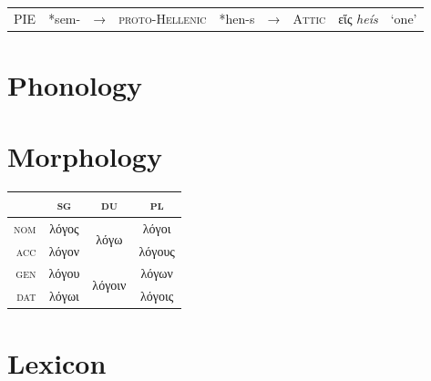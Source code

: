 \documentclass[svgnames,x11names,b5paper]{book}
\begin{document}
\begin{table}[H]
    \begin{center}
    \begin{tabular}{lllllllll}
    \textsc{PIE} & *sem- & → & \textsc{proto-Hellenic} & *hen-s & → & \textsc{Attic} & εἵς \textit{heís} & `one'
    \end{tabular}
    \end{center}
    \end{table}

\section{Phonology}

\section{Morphology}

\begin{table}[H]
    \begin{center}
    \begin{tabular}{r|ccc}
    \toprule
    & \textsc{sg} & \textsc{du} & \textsc{pl} \\
    \midrule
    \textsc{nom} & λόγος & \multirow{2}{*}{λόγω} & λόγοι\\
    \textsc{acc} & λόγον & & λόγους\\
    \textsc{gen} & λόγου & \multirow{2}{*}{λόγοιν} & λόγων\\
    \textsc{dat} & λόγωι & & λόγοις\\
    \bottomrule
    \end{tabular}
    \end{center}
    \end{table}

\section{Lexicon}

~~~~
\end{document}
